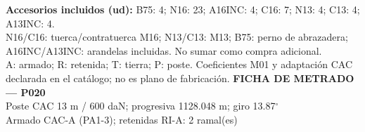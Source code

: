 \begingroup\scriptsize
\textbf{Accesorios incluidos (ud):} B75: 4; N16: 23; A16INC: 4; C16: 7; N13: 4; C13: 4; A13INC: 4.\\
N16/C16: tuerca/contratuerca M16; N13/C13: M13; B75: perno de abrazadera; A16INC/A13INC: arandelas incluidas. No sumar como compra adicional.\\
A: armado; R: retenida; T: tierra; P: poste. Coeficientes M01 y adaptación CAC declarada en el catálogo; no es plano de fabricación.
\endgroup\endgroup
\clearpage{}
\begingroup\small\setlength{\parskip}{3pt}\renewcommand{\arraystretch}{1.05}
\textbf{\large FICHA DE METRADO — P020}\\[4pt]
Poste CAC 13 m / 600 daN; progresiva 1128.048 m; giro 13.87\ensuremath{^\circ}\\
Armado CAC-A (PA1-3); retenidas RI-A: 2 ramal(es)\\
\begingroup\scriptsize
